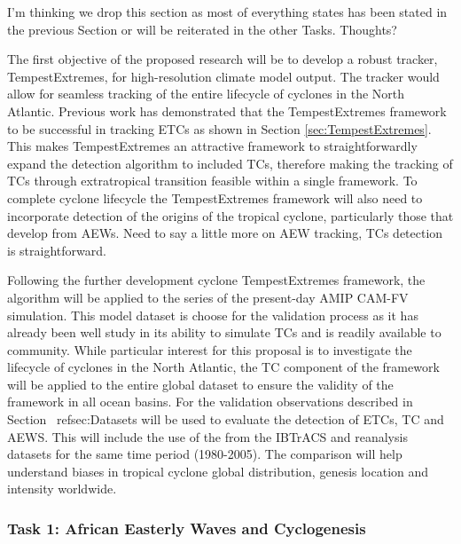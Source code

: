 \documentclass[11pt]{article}
\begin{document}
 {\color{red} I'm thinking we drop this section as most of everything states has been stated in the previous Section or will be reiterated in the other Tasks. Thoughts? }

The first objective of the proposed research will be to develop a robust tracker, TempestExtremes, for high-resolution climate model output. The tracker would allow for seamless tracking of the entire lifecycle of cyclones in the North Atlantic. Previous work has demonstrated that the TempestExtremes framework to be successful in tracking ETCs as shown in Section \ref{sec:TempestExtremes}. This makes TempestExtremes an attractive framework to straightforwardly expand the detection algorithm to included TCs, therefore making the tracking of TCs through extratropical transition feasible within a single framework. To complete cyclone lifecycle the TempestExtremes framework will also need to incorporate detection of the origins of the tropical cyclone, particularly those that develop from AEWs. {\color{red} Need to say a little more on AEW tracking, TCs detection is straightforward}.

Following the further development cyclone TempestExtremes framework, the algorithm will be applied to the series of the present-day AMIP CAM-FV simulation. This model dataset is choose for the validation process as it has already been well study in its ability to simulate TCs \citep{Bacmeister2014,Wehner2014} and is readily available to community. While particular interest for this proposal is to investigate the lifecycle of cyclones in the North Atlantic, the TC component of the framework will be applied to the entire global dataset to ensure the validity of the framework in all ocean basins. For the validation observations described in Section ~ref{sec:Datasets} will be used to evaluate the detection of ETCs, TC and AEWS.  This will include the use of the  from the IBTrACS and reanalysis datasets for the same time period (1980-2005). The comparison will help understand biases in tropical cyclone global distribution, genesis location and intensity worldwide.

\subsubsection{Task 1: African Easterly Waves and Cyclogenesis} 
\end{document}
